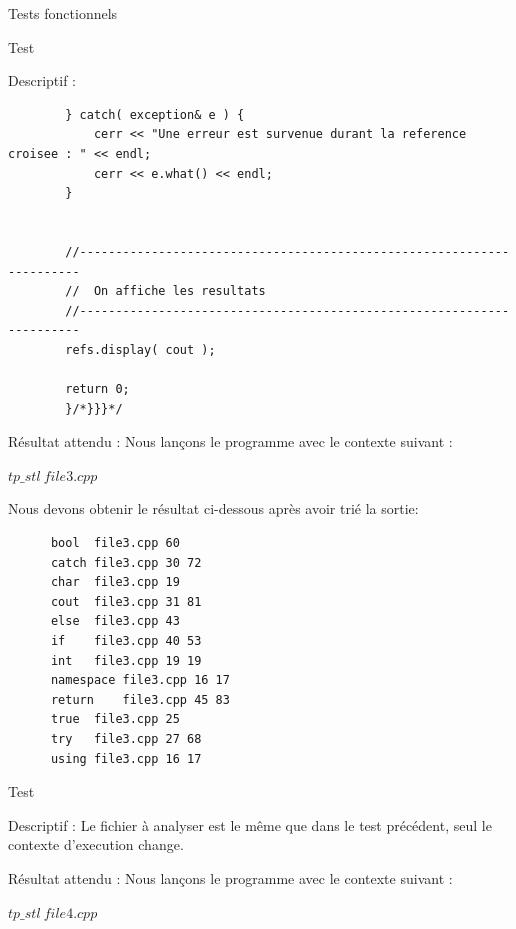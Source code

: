 \documentclass{article}
\begin{document}
\begin{section}{Tests fonctionnels}
\begin{subsection}{Test }
\begin{paragraph}{Descriptif :}
\begin{verbatim}
		} catch( exception& e ) {
		    cerr << "Une erreur est survenue durant la reference croisee : " << endl;
		    cerr << e.what() << endl;
		}


		//----------------------------------------------------------------------
		//  On affiche les resultats
		//----------------------------------------------------------------------
		refs.display( cout );

		return 0;
	    }/*}}}*/
      \end{verbatim}
      
    \end{paragraph}
    
    \newpage 
    
    \begin{paragraph}{Résultat attendu :}
       Nous lançons le programme avec le contexte suivant :  
       \begin{center}
	\textbf{$tp\_stl\ file3.cpp$}
      \end{center}
      
      Nous devons obtenir le résultat ci-dessous après avoir trié la sortie: 
      \begin{listing}[h!]
      \begin{verbatim}
	  bool	file3.cpp 60	
	  catch	file3.cpp 30 72	
	  char	file3.cpp 19	
	  cout	file3.cpp 31 81	
	  else	file3.cpp 43	
	  if	file3.cpp 40 53	
	  int	file3.cpp 19 19	
	  namespace	file3.cpp 16 17	
	  return	file3.cpp 45 83	
	  true	file3.cpp 25	
	  try	file3.cpp 27 68	
	  using	file3.cpp 16 17		
      \end{verbatim}
  
      \end{listing}
    \end{paragraph}
    
    
  \end{subsection}

  \newpage

  \begin{subsection}{Test }
    \begin{paragraph}{Descriptif :}
      Le fichier à analyser est le même que dans le test précédent, seul le contexte d'execution change.
    \end{paragraph}
    
\begin{paragraph}{Résultat attendu :}
       Nous lançons le programme avec le contexte suivant :  
       \begin{center}
	\textbf{$tp\_stl\ file4.cpp$}
      \end{center}
      

\end{paragraph}
\end{subsection}
\end{section}
\end{document}
